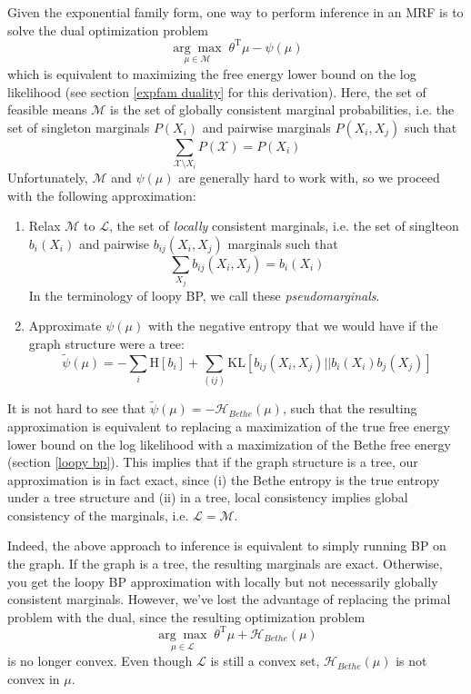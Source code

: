 \documentclass[a4paper]{article}
\begin{document}
Given the exponential family form, one way to perform inference in an MRF is to solve the dual optimization problem 
\[ \underset{\mu \in \mathcal{M}}{\arg\max}\; \theta^\textrm{T}\mu - \psi(\mu) \]
which is equivalent to maximizing the free energy lower bound on the log likelihood (see section \ref{expfam duality} for this derivation). Here, the set of feasible means $\mathcal{M}$ is the set of globally consistent marginal probabilities, i.e. the set of singleton marginals $P(X_i)$ and pairwise marginals $P(X_i,X_j)$ such that
\[ \sum_{\mathcal{X}\setminus X_i} P(\mathcal{X}) = P(X_i) \]
Unfortunately, $\mathcal{M}$ and $\psi(\mu)$ are generally hard to work with, so we proceed with the following approximation: 
\begin{enumerate}
\item Relax $\mathcal{M}$ to $\mathcal{L}$, the set of \emph{locally} consistent marginals, i.e. the set of singlteon $b_i(X_i)$ and pairwise $b_{ij}(X_i,X_j)$ marginals such that
\[ \sum_{X_j} b_{ij}(X_i,X_j) = b_i(X_i) \]
In the terminology of loopy BP, we call these \emph{pseudomarginals}.
\item Approximate $\psi(\mu)$ with the negative entropy that we would have if the graph structure were a tree:
\[ \tilde{\psi}(\mu) = -\sum_i \textrm{H}[b_i] + \sum_{(ij)} \textrm{KL}[b_{ij}(X_i,X_j)||b_i(X_i)b_j(X_j)] \]
\end{enumerate}
It is not hard to see that $\tilde{\psi}(\mu) = -\mathcal{H}_{Bethe}(\mu)$, such that the resulting approximation is equivalent to replacing a maximization of the true free energy lower bound on the log likelihood with a maximization of the Bethe free energy (section \ref{loopy bp}). This implies that if the graph structure is a tree, our approximation is in fact exact, since (i) the Bethe entropy is the true entropy under a tree structure and (ii) in a tree, local consistency implies global consistency of the marginals, i.e. $\mathcal{L} = \mathcal{M}$. 

Indeed, the above approach to inference is  equivalent to simply running BP on the graph. If the graph is a tree, the resulting marginals are exact. Otherwise, you get the loopy BP approximation with locally but not necessarily globally consistent marginals. However, we've lost the advantage of replacing the primal problem with the dual, since the resulting optimization problem 
\[ \underset{\mu \in \mathcal{L}}{\arg\max}\; \theta^\textrm{T}\mu + \mathcal{H}_{Bethe}(\mu) \]
is no longer convex. Even though $\mathcal{L}$ is still a convex set, $\mathcal{H}_{Bethe}(\mu)$ is not convex in $\mu$. 
\end{document}
